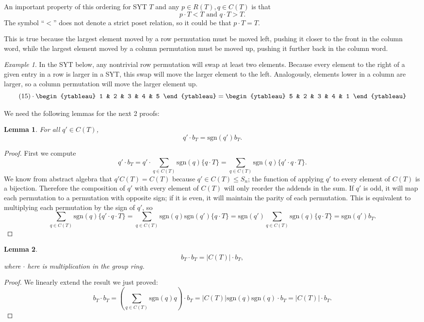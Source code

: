 \documentclass[12pt,twoside]{reedthesis}
\theoremstyle{plain}   %
\newtheorem{lemma}{Lemma}[section]
\theoremstyle{definition}
\theoremstyle{remark}
\newtheorem{ex}{Example}[section]
\numberwithin{equation}{section}
\def\sgn{\mathrm{sgn}}
\begin{document}
  An important property of this ordering for SYT $T$ and any $p \in R(T), q\in C(T)$ is that
  \[ p \cdot T < T \text{ and } q \cdot T > T.\]
  The symbol ``$<$'' does not denote a strict poset relation, so it could be that $p \cdot T = T$. \par
  This is true because the largest element moved by a row permutation must be moved left, pushing it closer to the front in the column word,
  while the largest element moved by a column permutation must be moved up, pushing it further back in the column word.
  \begin{ex}
    In the SYT below, any nontrivial row permutation will swap at least two elements.
    Because every element to the right of a given entry in a row is larger in a SYT, this swap will move the larger element to the left.
    Analogously, elements lower in a column are larger, so a column permutation will move the larger element up.
    \[
      (15) \cdot 
      \begin{ytableau}
        1 & 2 & 3 & 4 & 5 
      \end{ytableau}
      =
      \begin{ytableau}
        5 & 2 & 3 & 4 & 1 
      \end{ytableau}
    \]
  \end{ex}

  We need the following lemmas for the next 2 proofs:
  \begin{lemma}
    For all $q' \in C(T)$,
    \[q' \cdot b_T = \sgn(q') b_T.\]
  \end{lemma}
  \begin{proof}
    
    First we compute
    \[q' \cdot b_T = q' \cdot \sum_{q \in C(T)} \sgn(q)\{q \cdot T\} = \sum_{q \in C(T)} \sgn(q)\{q' \cdot q \cdot T\}.\]
    We know from abstract algebra that $q' C(T) = C(T)$ because $q' \in C(T) \leq S_n$; the function of applying $q'$ to every element of $C(T)$ is a
    bijection.
    Therefore the composition of $q'$ with every element of $C(T)$ will only reorder the addends in the sum.
    If $q'$ is odd, it will map each permutation to a permutation with opposite sign; if it is even, it will maintain the parity of each permutation.
    This is equivalent to multiplying  each permutation by the sign of $q'$, so
    \[\sum_{q \in C(T)} \sgn(q)\{q' \cdot q \cdot T\} = \sum_{q \in C(T)} \sgn(q)\sgn(q') \{q \cdot T\}
      = \sgn(q') \sum_{q \in C(T)} \sgn(q) \{q \cdot T\} = \sgn(q') b_T.\]
  \end{proof}
  \begin{lemma}
    \[b_T \cdot b_T = |C(T)| \cdot b_T,\] where $\cdot$ here is multiplication in the group ring.
  \end{lemma}
  \begin{proof}
    We linearly extend the result we just proved:
    \[ b_T \cdot b_T = (\sum_{q \in C(T)} \sgn(q)q) \cdot b_T = |C(T)|\sgn(q)\sgn(q) \cdot b_T = |C(T)| \cdot b_T.\]  
  \end{proof}
\end{document}
